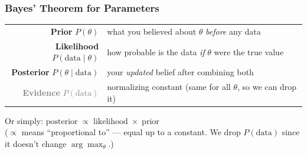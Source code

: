 \documentclass[aspectratio=169]{beamer}
\begin{document}
\begin{frame}
\frametitle{Bayes' Theorem for Parameters}
\begin{center}
\end{center}

\pause
\vspace{0.1cm}
\centering\small
\renewcommand{\arraystretch}{1.3}
\begin{tabular}{@{}r@{\; --- \;}l@{}}
\textcolor{popblue}{\textbf{Prior} $P(\theta)$} & what you believed about $\theta$ \textit{before} any data\\
\textcolor{sampred}{\textbf{Likelihood} $P(\text{data} \mid \theta)$} & how probable is the data \textit{if} $\theta$ were the true value\\
\textcolor{violet1}{\textbf{Posterior} $P(\theta \mid \text{data})$} & your \textit{updated} belief after combining both\\
\textcolor{gray}{\textbf{Evidence} $P(\text{data})$} & normalizing constant (same for all $\theta$, so we can drop it)\\
\end{tabular}

\pause
\vspace{0.15cm}

\small Or simply: \quad $\text{posterior} \;\propto\; \text{likelihood} \;\times\; \text{prior}$\\[3pt]
{\footnotesize ($\propto$ means ``proportional to'' --- equal up to a constant. We drop $P(\text{data})$ since it doesn't change $\arg\max_\theta$.)}

\end{frame}
\end{document}
